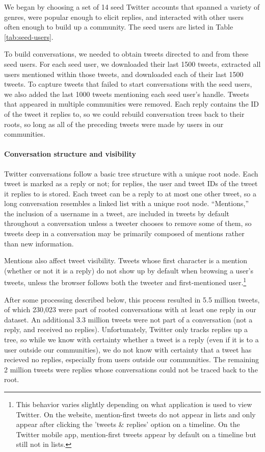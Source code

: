\documentclass[11pt,letterpaper]{article}
\begin{document}
We began by choosing a set of 14 seed Twitter accounts that spanned a variety of genres, were popular enough to elicit replies, and interacted with other users often enough to build up a community.  The seed users are listed in Table \ref{tab:seed-users}.  

To build conversations, we needed to obtain tweets directed to and from these seed users. For each seed user, we downloaded their last 1500 tweets, extracted all users mentioned within those tweets, and downloaded each of their last 1500 tweets.  To capture tweets that failed to start conversations with the seed users, we also added the last 1000 tweets mentioning each seed user's handle.  Tweets that appeared in multiple communities were removed.  Each reply contains the ID of the tweet it replies to, so we could rebuild conversation trees back to their roots, so long as all of the preceding tweets were made by users in our communities.

\paragraph{Conversation structure and visibility}

Twitter conversations follow a basic tree structure with a unique root node. Each tweet is marked as a reply or not; for replies, the user and tweet IDs of the tweet it replies to is stored. Each tweet can be a reply to at most one other tweet, so a long conversation resembles a linked list with a unique root node. ``Mentions,'' the inclusion of a username in a tweet, are included in tweets by default throughout a conversation unless a tweeter chooses to remove some of them, so tweets deep in a conversation may be primarily composed of mentions rather than new information.

Mentions also affect tweet visibility.  Tweets whose first character is a mention (whether or not it is a reply) do not show up by default when browsing a user's tweets, unless the browser follows both the tweeter and first-mentioned user.\footnote{This behavior varies slightly depending on what application is used to view Twitter.  On the website, mention-first tweets do not appear in lists and only appear after clicking the 'tweets \& replies' option on a timeline. On the Twitter mobile app, mention-first tweets appear by default on a timeline but still not in lists.}

After some processing described below, this process resulted in 5.5 million tweets, of which 230,023 were part of rooted conversations with at least one reply in our dataset. An additional 3.3 million tweets were not part of a conversation (not a reply, and received no replies).  Unfortunately, Twitter only tracks replies up a tree, so while we know with certainty whether a tweet is a reply (even if it is to a user outside our communities), we do not know with certainty that a tweet has recieved no replies, especially from users outside our communities.  The remaining 2 million tweets were replies whose conversations could not be traced back to the root.
\end{document}
